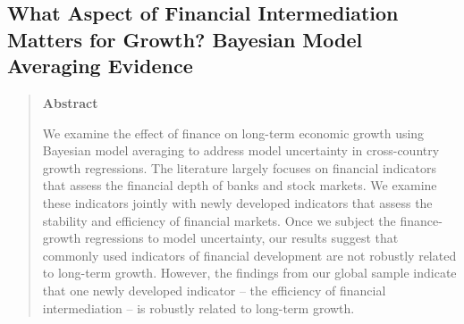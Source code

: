 \begin{refsection}
	\chapter[What Type of Finance Matters for Growth? BMA Evidence]{What Aspect of Financial Intermediation Matters for Growth? Bayesian Model Averaging Evidence}
\label{ch2}

\begin{quote}
\begin{center}\textbf{Abstract}\end{center}
	We examine the effect of finance on long-term economic growth using Bayesian model averaging to address model uncertainty in cross-country growth regressions. The literature largely focuses on financial indicators that assess the financial depth of banks and stock markets. We examine these indicators jointly with newly developed indicators that assess the stability and efficiency of financial markets. Once we subject the finance-growth regressions to model uncertainty, our results suggest that commonly used indicators of financial development are not robustly related to long-term growth. However, the findings from our global sample indicate that one newly developed indicator -- the efficiency of financial intermediation -- is robustly related to long-term growth.     
	\end{quote}

\clearpage

\end{refsection}
